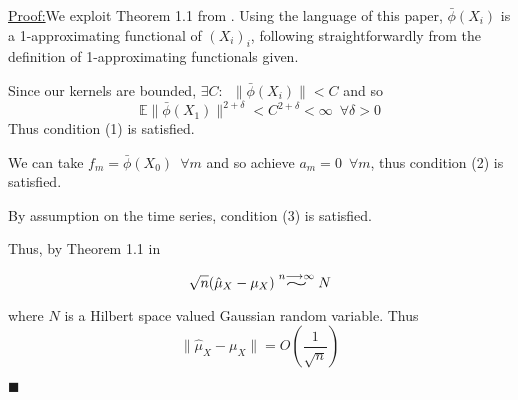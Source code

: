\documentclass{article}
\newenvironment{claimproof}[1]{\par\noindent\underline{Proof:}\space#1}{\hfill $\blacksquare$}
\newcommand{\widesim}[2][1.5]{
  \mathrel{\overset{#2}{\scalebox{#1}[1]{$\sim$}}}}
\begin{document}
\begin{claimproof}
We exploit Theorem 1.1 from \cite{dehling2015bootstrap}. Using the language of this paper, $\bar{\phi}(X_i)$ is a 1-approximating functional of $(X_i)_i$, following straightforwardly from the definition of 1-approximating functionals given. 

Since our kernels are bounded, $\exists C: \enspace \|\bar{\phi}(X_i)\| < C $ and so \[\mathbb{E}\|\bar{\phi}(X_1)\|^{2+\delta} <C^{2+\delta}< \infty \enspace \forall \delta>0\]
Thus condition (1) is satisfied.

We can take $f_m = \bar{\phi}(X_0)\enspace \forall m$ and so achieve $a_m= 0 \enspace \forall m$, thus condition (2) is satisfied.

By assumption on the time series, condition (3) is satisfied.

Thus, by Theorem 1.1 in \cite{dehling2015bootstrap}

\[\sqrt{n} (\hat{\mu}_{X} - \mu_{X}) \widesim[2]{n\longrightarrow\infty} N\]


where $N$ is a Hilbert space valued Gaussian random variable. Thus 
\[\|\hat{\mu}_{X} - \mu_{X}\| = O(\frac{1}{\sqrt{n}})\]

\end{claimproof}
\end{document}
